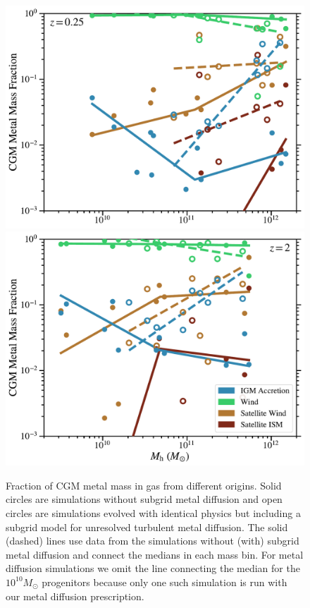 \documentclass[fleqn,usenatbib]{mnras}
\begin{document}
\begin{figure}
\includegraphics[width=\columnwidth]{figures/CGM_enrichedmetalmass_frac_vs_Mh_CGM_snum465.pdf}
\includegraphics[width=\columnwidth]{figures/CGM_enrichedmetalmass_frac_vs_Mh_CGM_snum172.pdf}
\caption{
Fraction of CGM metal mass in gas from different origins.
Solid circles are simulations without subgrid metal diffusion and open circles are simulations evolved with identical physics but including a subgrid model for unresolved turbulent metal diffusion.
The solid (dashed) lines use data from the simulations without (with) subgrid metal diffusion and connect the medians in each mass bin.
For metal diffusion simulations we omit the line connecting the median for the $10^{10} M_\odot$ progenitors because only one such simulation is run with our metal diffusion prescription.
}
\end{figure}
\end{document}

